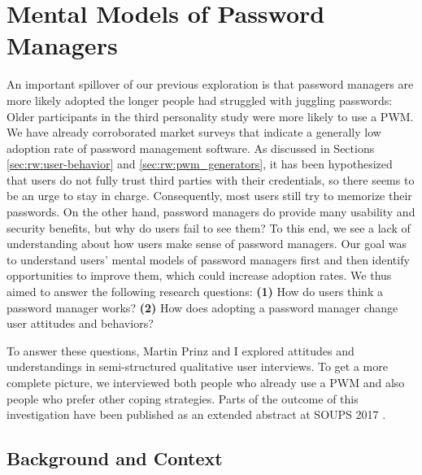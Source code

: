 \chapter[Mental Models of Password Managers]{Mental Models of Password Managers}\label{chap:mental_models_pwm}
An important spillover of our previous exploration is that password managers are more likely adopted the longer people had struggled with juggling passwords: Older participants in the third personality study were more likely to use a \gls{PWM}. We have already corroborated market surveys that indicate a generally low adoption rate of password management software. As discussed in Sections \ref{sec:rw:user-behavior} and \ref{sec:rw:pwm_generators}, it has been hypothesized that users do not fully trust third parties with their credentials, so there seems to be an urge to stay in charge. Consequently, most users still try to memorize their passwords. On the other hand, password managers do provide many usability and security benefits, but why do users fail to see them? To this end, we see a lack of understanding about how users make sense of password managers. Our goal was to understand users' mental models of password managers first and then identify opportunities to improve them, which could increase adoption rates. 
We thus aimed to answer the following research questions: 
\textbf{(1)} How do users think a password manager works? 
\textbf{(2)} How does adopting a password manager change user attitudes and behaviors?


To answer these questions, Martin Prinz and I explored attitudes and understandings in semi-structured qualitative user interviews. To get a more complete picture, we interviewed both people who already use a \gls{PWM} and also people who prefer other coping strategies. Parts of the outcome of this investigation have been published as an extended abstract at SOUPS 2017 \cite{Prinz2017MentalModel}.

\section{Background and Context}

